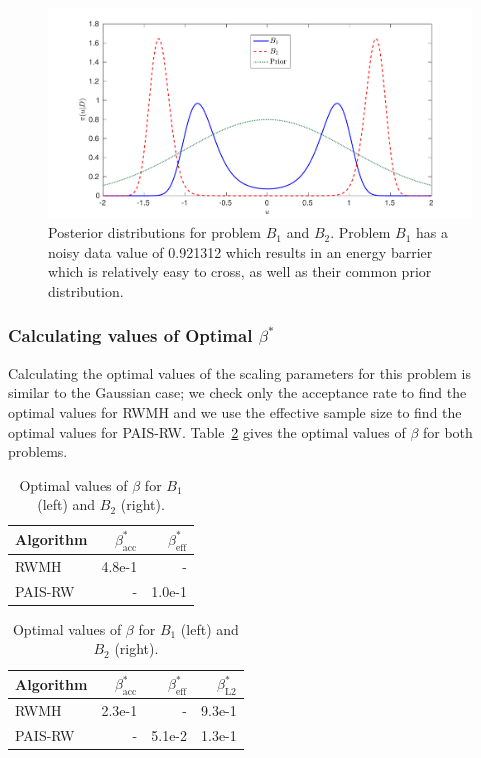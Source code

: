 \documentclass[final]{siamltex}
\begin{document}
\begin{figure}[htpb]
\begin{center}
\includegraphics[width=\textwidth]{"figures/posteriors3"}
\caption{Posterior distributions for problem $B_1$ and $B_2$. Problem $B_1$ has a noisy data value of  0.921312 which results in an energy barrier which is relatively easy to cross, as well as their common prior distribution.}
\label{fig:problem 3 posteriors}
\end{center}
\end{figure}

\subsubsection{Calculating values of Optimal $\beta^*$}\label{sec:BM1_opt_beta}

Calculating the optimal values of the scaling parameters for this problem is similar to the Gaussian case; we check only the acceptance rate to find the optimal values for RWMH and we use the effective sample size to find the optimal values for PAIS-RW. Table~\ref{table:BM_opt_beta} gives the optimal values of $\beta$ for both problems.

\begin{table}[!htb]
    \begin{minipage}{.5\linewidth}
      \centering
        \begin{tabular}{|l|r|r|}
	\hline
	Algorithm							& $\beta^*_{\text{acc}}$	& $\beta^*_{\text{eff}}$ \\ \hline
	RWMH								& 4.8e-1					& - \\
	PAIS-RW								& -						& 1.0e-1\\
	\hline
	\end{tabular}
    \end{minipage}%
    \begin{minipage}{.5\linewidth}
      \centering
        \begin{tabular}{|l|r|r|r|}
	\hline
	Algorithm							& $\beta^*_{\text{acc}}$	& $\beta^*_{\text{eff}}$	& $\beta^*_{\text{L2}}$ \\ \hline
	RWMH								& 2.3e-1					& - 						& 9.3e-1\\
	PAIS-RW								& -						& 5.1e-2 					& 1.3e-1\\
	\hline
	\end{tabular}
    \end{minipage}
	\vspace{1mm}
	\caption{Optimal values of $\beta$ for $B_1$ (left) and $B_2$ (right).}
	\label{table:BM_opt_beta}
\end{table}
\end{document}
